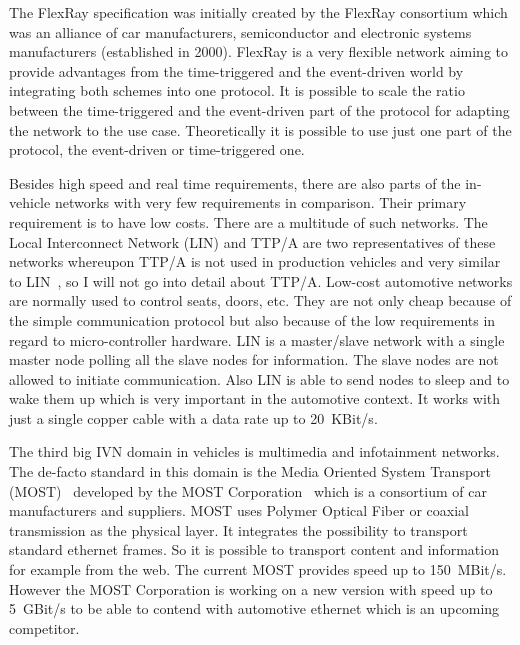 The FlexRay specification was initially created by the FlexRay consortium which
was an alliance of car manufacturers, semiconductor and electronic systems
manufacturers (established in 2000). FlexRay is a very flexible network aiming
to provide advantages from the time-triggered and the event-driven world by
integrating both schemes into one protocol. It is possible to scale the ratio
between the time-triggered and the event-driven part of the protocol for
adapting the network to the use case. Theoretically it is possible to use just
one part of the protocol, the event-driven or time-triggered one.

Besides high speed and real time requirements, there are also parts of the
in-vehicle networks with very few requirements in comparison. Their primary
requirement is to have low costs. There are a multitude of such networks. The
Local Interconnect Network (LIN) and TTP/A are two representatives of these
networks whereupon TTP/A is not used in production vehicles and very similar to
LIN~\cite{Navet2017}, so I will not go into detail about TTP/A. Low-cost
automotive networks are normally used to control seats, doors, etc. They are not
only cheap because of the simple communication protocol but also because of the
low requirements in regard to micro-controller hardware. LIN is a master/slave
network with a single master node polling all the slave nodes for information.
The slave nodes are not allowed to initiate communication. Also LIN is able to
send nodes to sleep and to wake them up which is very important in the
automotive context. It works with just a single copper cable with a data rate up
to 20~KBit/s.

The third big IVN domain in vehicles is multimedia and infotainment networks.
The de-facto standard in this domain is the Media Oriented System Transport
(MOST)~\cite{Navet2017} developed by the MOST Corporation~\cite{MOST2018} which
is a consortium of car manufacturers and suppliers. MOST uses Polymer Optical
Fiber or coaxial transmission as the physical layer. It integrates the
possibility to transport standard ethernet frames. So it is possible to
transport content and information for example from the web. The current MOST
provides speed up to 150~MBit/s. However the MOST Corporation is working on a
new version with speed up to 5~GBit/s to be able to contend with automotive
ethernet which is an upcoming competitor.

